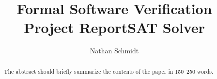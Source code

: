 \documentclass[runningheads]{llncs}
\begin{document}
%
\title{Formal Software Verification Project Report\newline{}SAT Solver}
%
%
\author{Nathan Schmidt}
%
%
%
\maketitle              %
%
\begin{abstract}
The abstract should briefly summarize the contents of the paper in
150--250 words.

\end{abstract}
%
%
%





\end{document}
